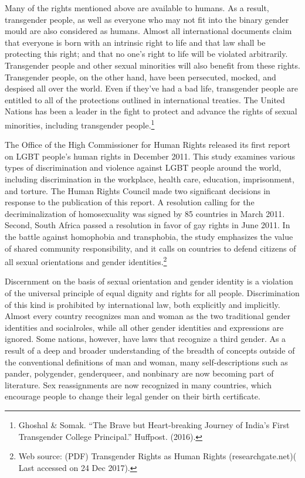 \begin{multicols}{2}

\noi
Many of the rights mentioned above are available to humans. As a result, transgender people,
as well as everyone who may not fit into the binary gender mould are also considered as
humans. Almost all international documents claim that everyone is born with an intrinsic right
to life and that law shall be protecting this right; and that no one's right to life will be violated
arbitrarily. Transgender people and other sexual minorities will also benefit from these rights.
Transgender people, on the other hand, have been persecuted, mocked, and despised all over
the world. Even if they've had a bad life, transgender people are entitled to all of the protections
outlined in international treaties. The United Nations has been a leader in the fight to protect
and advance the rights of sexual minorities, including transgender people.\footnote{Ghoshal \& Somak. “The Brave but Heart-breaking Journey of India’s First Transgender College Principal.” Huffpost. (2016).}

\noi
The Office of the High Commissioner for Human Rights released its first report on LGBT
people's human rights in December 2011. This study examines various types of discrimination
and violence against LGBT people around the world, including discrimination in the
workplace, health care, education, imprisonment, and torture. The Human Rights Council made
two significant decisions in response to the publication of this report. A resolution calling for
the decriminalization of homosexuality was signed by 85 countries in March 2011. Second,
South Africa passed a resolution in favor of gay rights in June 2011. In the battle against
homophobia and transphobia, the study emphasizes the value of shared community
responsibility, and it calls on countries to defend citizens of all sexual orientations and gender
identities.\footnote{Web source: (PDF) Transgender Rights as Human Rights (researchgate.net)( Last accessed on 24 Dec 2017).}

\noi
Discernment on the basis of sexual orientation and gender identity is a violation of the universal
principle of equal dignity and rights for all people. Discrimination of this kind is prohibited by
international law, both explicitly and implicitly. Almost every country recognizes man and
woman as the two traditional gender identities and socialroles, while all other gender identities
and expressions are ignored. Some nations, however, have laws that recognize a third gender.
As a result of a deep and broader understanding of the breadth of concepts outside of the
conventional definitions of man and woman, many self-descriptions such as pander,
polygender, genderqueer, and nonbinary are now becoming part of literature. Sex
reassignments are now recognized in many countries, which encourage people to change their
legal gender on their birth certificate.


\end{multicols}
